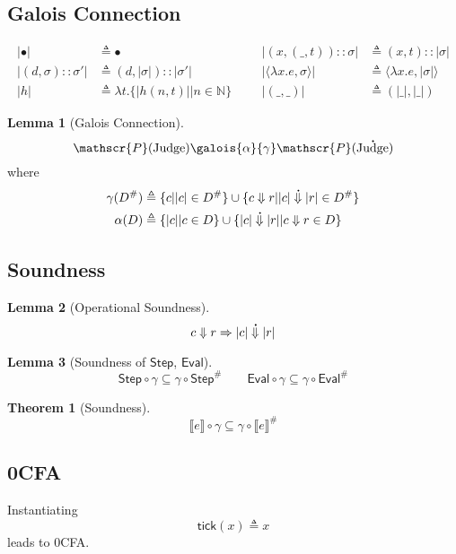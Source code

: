 \documentclass{article}
\theoremstyle{definition}
\newtheorem{lem}{Lemma}[section]
\newtheorem{thm}{Theorem}[section]
\newcommand*{\cons}{::}
\newcommand*{\pset}{\mathscr{P}}
\newcommand*{\A}[1]{\overset{{\,_{\mbox{\Large .}}}}{#1}}
\newcommand*{\Abs}[1]{{#1}^{\#}}
\newcommand*{\modid}{d}
\newcommand*{\ctx}{\sigma}
\newcommand*{\mem}{h}
\newcommand*{\Judge}{\text{Judge}}
\newcommand*{\Step}{\mathsf{Step}}
\newcommand*{\Eval}{\mathsf{Eval}}
\newcommand*{\sembracket}[1]{\lBrack{#1}\rBrack}
\newcommand*{\tick}{\mathsf{tick}}
\begin{document}
\subsection{Galois Connection}
\begin{align*}
  |\bullet|                 & \triangleq\bullet                                  &  &  & |(x,(\_,t))\cons\ctx|            & \triangleq(x,t)\cons|\ctx|                 \\
  |(\modid,\ctx)\cons\ctx'| & \triangleq(\modid,|\ctx|)\cons|\ctx'|              &  &  & |\langle\lambda x.e,\ctx\rangle| & \triangleq\langle\lambda x.e,|\ctx|\rangle \\
  |\mem|                    & \triangleq\lambda t.\{|\mem(n,t)||n\in\mathbb{N}\} &  &  & |(\_,\_)|                        & \triangleq(|\_|,|\_|)
\end{align*}
\begin{lem}[Galois Connection]
  \[\pset(\Judge)\galois{\alpha}{\gamma}\pset(\A\Judge)\]
  where
  \begin{align*}
    \gamma(\Abs{D}) & \triangleq\{c||c|\in\Abs{D}\}\cup\{c\Downarrow r||c|\A\Downarrow|r|\in\Abs{D}\} \\
    \alpha(D)       & \triangleq\{|c||c\in D\}\cup\{|c|\A\Downarrow|r||c\Downarrow r\in D\}
  \end{align*}
\end{lem}
\subsection{Soundness}
\begin{lem}[Operational Soundness]
  \[c\Downarrow r\Rightarrow|c|\A\Downarrow|r|\]
\end{lem}
\begin{lem}[Soundness of $\Step$, $\Eval$]
  \[\Step\circ\gamma\subseteq\gamma\circ\Abs\Step\qquad\Eval\circ\gamma\subseteq\gamma\circ\Abs\Eval\]
\end{lem}
\begin{thm}[Soundness]
  \[\sembracket{e}\circ\gamma\subseteq\gamma\circ\Abs{\sembracket{e}}\]
\end{thm}
\subsection{0CFA}
Instantiating
\[\tick(x)\triangleq x\]
leads to 0CFA.
\end{document}
